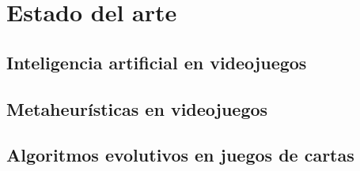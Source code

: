 \chapter{Estado del arte} \label{chap:antecedentes}


\section{Inteligencia artificial en videojuegos} \label{sec:ia_videojuegos}

\section{Metaheurísticas en videojuegos} \label{sec:estado_arte}


\section{Algoritmos evolutivos en juegos de cartas} \label{sec:trabajos_relacionados}
